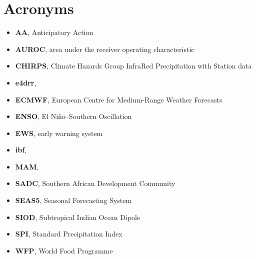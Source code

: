 \documentclass{article}
\begin{document}
\section*{Acronyms}
\begin{itemize}
\item {\bf AA}, Anticipatory Action
\item {\bf AUROC}, area under the receiver operating characteristic
\item {\bf CHIRPS}, Climate Hazards Group InfraRed Precipitation with Station data
\item {\bf e4drr}, 
\item {\bf ECMWF}, European Centre for Medium-Range Weather Forecasts
\item {\bf ENSO}, El Niño–Southern Oscillation
\item {\bf EWS}, early warning system
\item {\bf ibf}, 
\item {\bf MAM}, 
\item {\bf SADC}, Southern African Development Community
\item {\bf SEAS5}, Seasonal Forecasting System
\item {\bf SIOD}, Subtropical Indian Ocean Dipole
\item {\bf SPI}, Standard Precipitation Index
\item {\bf WFP}, World Food Programme
\end{itemize}
\end{document}
